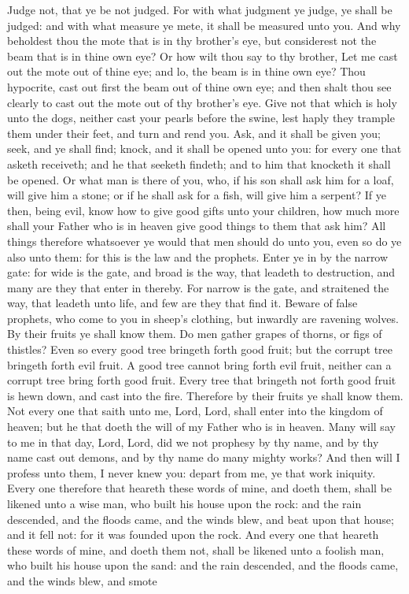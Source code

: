 Judge not, that ye be not judged. For with what judgment ye judge, ye shall be judged: and with what measure ye mete, it shall be measured unto you. And why beholdest thou the mote that is in thy brother’s eye, but considerest not the beam that is in thine own eye? Or how wilt thou say to thy brother, Let me cast out the mote out of thine eye; and lo, the beam is in thine own eye? Thou hypocrite, cast out first the beam out of thine own eye; and then shalt thou see clearly to cast out the mote out of thy brother’s eye.  Give not that which is holy unto the dogs, neither cast your pearls before the swine, lest haply they trample them under their feet, and turn and rend you.  Ask, and it shall be given you; seek, and ye shall find; knock, and it shall be opened unto you: for every one that asketh receiveth; and he that seeketh findeth; and to him that knocketh it shall be opened. Or what man is there of you, who, if his son shall ask him for a loaf, will give him a stone; or if he shall ask for a fish, will give him a serpent? If ye then, being evil, know how to give good gifts unto your children, how much more shall your Father who is in heaven give good things to them that ask him? All things therefore whatsoever ye would that men should do unto you, even so do ye also unto them: for this is the law and the prophets.  Enter ye in by the narrow gate: for wide is the gate, and broad is the way, that leadeth to destruction, and many are they that enter in thereby. For narrow is the gate, and straitened the way, that leadeth unto life, and few are they that find it.  Beware of false prophets, who come to you in sheep’s clothing, but inwardly are ravening wolves. By their fruits ye shall know them. Do men gather grapes of thorns, or figs of thistles? Even so every good tree bringeth forth good fruit; but the corrupt tree bringeth forth evil fruit. A good tree cannot bring forth evil fruit, neither can a corrupt tree bring forth good fruit. Every tree that bringeth not forth good fruit is hewn down, and cast into the fire. Therefore by their fruits ye shall know them. Not every one that saith unto me, Lord, Lord, shall enter into the kingdom of heaven; but he that doeth the will of my Father who is in heaven. Many will say to me in that day, Lord, Lord, did we not prophesy by thy name, and by thy name cast out demons, and by thy name do many mighty works? And then will I profess unto them, I never knew you: depart from me, ye that work iniquity.  Every one therefore that heareth these words of mine, and doeth them, shall be likened unto a wise man, who built his house upon the rock: and the rain descended, and the floods came, and the winds blew, and beat upon that house; and it fell not: for it was founded upon the rock. And every one that heareth these words of mine, and doeth them not, shall be likened unto a foolish man, who built his house upon the sand: and the rain descended, and the floods came, and the winds blew, and smote 